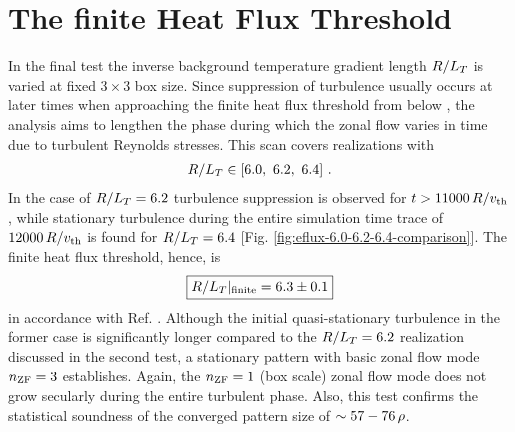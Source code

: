 
\newpage
\section{The finite Heat Flux Threshold}
\label{sec:threshold}

In the final test the inverse background temperature gradient length $R/L_T$ is varied at fixed $3\times3$ box size.
Since suppression of turbulence usually occurs at later times when approaching the finite heat flux threshold from below \cite{Peeters2016}, the analysis aims to lengthen the phase during which the zonal flow varies in time due to turbulent Reynolds stresses.
This scan covers realizations with
\begin{gather*}
	R/L_T \in [6.0,~6.2,~6.4]~.
\end{gather*}
In the case of $R/L_T = 6.2$ turbulence suppression is observed for $t > 11000\,R/v_{\mathrm{th}}$, while stationary turbulence during the entire simulation time trace of $12000\,R/v_{\mathrm{th}}$ is found for $R/L_T = 6.4$ [Fig. \ref{fig:eflux-6.0-6.2-6.4-comparison}].
The finite heat flux threshold, hence, is
\begin{gather*}
	\boxed{R/L_T|_\mathrm{finite} = 6.3 \pm 0.1}
\end{gather*}
in accordance with Ref. .
Although the initial quasi-stationary turbulence in the former case is significantly longer compared to the $R/L_T = 6.2$ realization discussed in the second test, a stationary pattern with basic zonal flow mode $n_\mathrm{ZF} = 3$ establishes. 
Again, the $n_\mathrm{ZF} = 1$ (box scale) zonal flow mode does not grow secularly during the entire turbulent phase.
Also, this test confirms the statistical soundness of the converged pattern size of $\sim 57 - 76\,\rho$.

